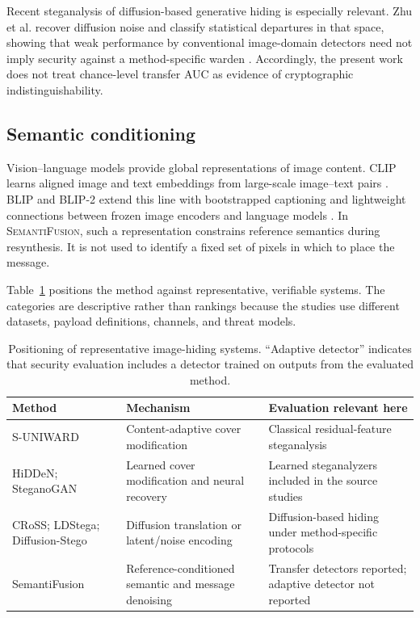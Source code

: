 \documentclass[pdflatex,sn-mathphys-num]{sn-jnl}
\newcommand{\method}{\textsc{SemantiFusion}}
\begin{document}
Recent steganalysis of diffusion-based generative hiding is especially relevant. Zhu et al. recover diffusion noise and classify statistical departures in that space, showing that weak performance by conventional image-domain detectors need not imply security against a method-specific warden \cite{zhu2026rethinking}. Accordingly, the present work does not treat chance-level transfer AUC as evidence of cryptographic indistinguishability.

\subsection{Semantic conditioning}

Vision--language models provide global representations of image content. CLIP learns aligned image and text embeddings from large-scale image--text pairs \cite{radford2021learning}. BLIP and BLIP-2 extend this line with bootstrapped captioning and lightweight connections between frozen image encoders and language models \cite{li2022blip,li2023blip2}. In \method, such a representation constrains reference semantics during resynthesis. It is not used to identify a fixed set of pixels in which to place the message.

Table~\ref{tab:positioning} positions the method against representative, verifiable systems. The categories are descriptive rather than rankings because the studies use different datasets, payload definitions, channels, and threat models.

\begin{table}[t]
\centering
\caption{Positioning of representative image-hiding systems. ``Adaptive detector'' indicates that security evaluation includes a detector trained on outputs from the evaluated method.}
\label{tab:positioning}
\small
\begin{tabularx}{\columnwidth}{p{2.2cm}p{2.7cm}X}
\toprule
\textbf{Method} & \textbf{Mechanism} & \textbf{Evaluation relevant here} \\
\midrule
S-UNIWARD \cite{holub2014universal} & Content-adaptive cover modification & Classical residual-feature steganalysis \\
HiDDeN; SteganoGAN \cite{zhu2018hidden,zhang2019steganogan} & Learned cover modification and neural recovery & Learned steganalyzers included in the source studies \\
CRoSS; LDStega; Diffusion-Stego \cite{yu2023cross,peng2024ldstega,kim2025diffusionstego} & Diffusion translation or latent/noise encoding & Diffusion-based hiding under method-specific protocols \\
SemantiFusion & Reference-conditioned semantic and message denoising & Transfer detectors reported; adaptive detector not reported \\
\bottomrule
\end{tabularx}
\end{table}
\end{document}
